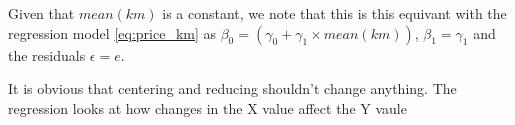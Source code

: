 \noindent
Given that $mean(km)$ is a constant, we note that this is this equivant with the regression model \ref{eq:price_km} as $\beta_0 = (\gamma_0 + \gamma_1 \times mean(km))$, $\beta_1 = \gamma_1$ and the residuals $\epsilon = e$.
	
It is obvious that centering and reducing shouldn't change anything. The regression looks at how changes in the X value affect the Y vaule


